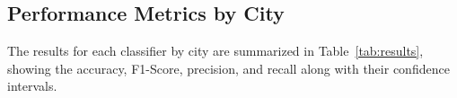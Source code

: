 \documentclass{ieeeaccess}
\begin{document}




\subsection{Performance Metrics by City}
The results for each classifier by city are summarized in Table~\ref{tab:results}, showing the accuracy, F1-Score, precision, and recall along with their confidence intervals.
\end{document}
